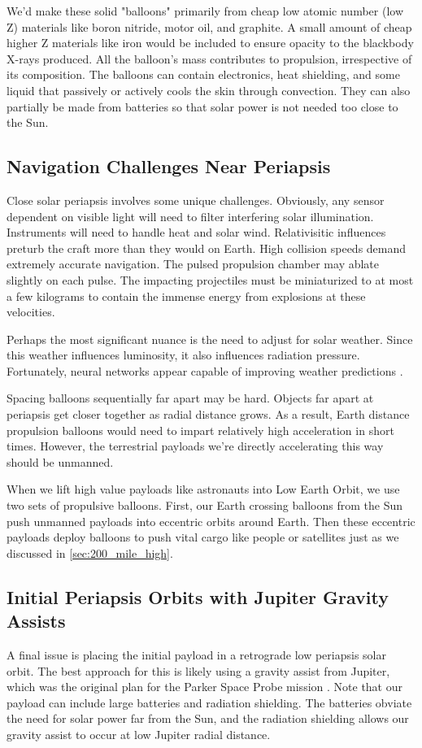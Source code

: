 \documentclass{article}
\begin{document}
{We'd make these solid "balloons" primarily from cheap low atomic number (low Z) materials like boron nitride, motor oil, and graphite.  A small amount of cheap higher Z materials like iron would be included to ensure opacity to the blackbody X-rays produced.  
All the balloon's mass contributes to propulsion, irrespective of its composition.  The balloons can contain electronics, heat shielding, and some liquid that passively or actively cools the skin through convection.     They can also partially be made from batteries so that solar power is not needed too close to the Sun.    

\subsection{Navigation Challenges Near Periapsis}
Close solar periapsis involves some unique challenges.   Obviously, any sensor dependent on visible light will need to filter interfering solar illumination.   Instruments will need to handle heat and solar wind.  Relativisitic influences preturb the craft more than they would on Earth.  High collision speeds demand extremely accurate navigation.   The pulsed propulsion chamber may ablate slightly on each pulse.  The impacting projectiles must be miniaturized to at most a few kilograms to contain the immense energy from explosions at these velocities. 

Perhaps the most significant nuance is the need to adjust for solar weather.  Since this weather influences luminosity, it also influences radiation pressure.   Fortunately, neural networks appear capable of improving weather predictions \cite{lam2023learning}.   

Spacing balloons sequentially far apart  may be hard.  Objects far apart at periapsis get closer together as radial distance grows.  As a result, Earth distance propulsion balloons would need to impart relatively high acceleration in short times.  However, the terrestrial payloads we're directly accelerating this way should be unmanned.   

When we lift high value payloads like astronauts into Low Earth Orbit, we use two sets of propulsive balloons. First, our Earth crossing balloons from the Sun push unmanned payloads into eccentric orbits around Earth. Then these eccentric payloads deploy balloons to push vital cargo like people or  satellites just as we discussed in \autoref{sec:200_mile_high}.

\subsection{Initial Periapsis Orbits with Jupiter Gravity Assists} \label{sec:jupiter_gravity_initial}
A final issue is placing the initial payload in a retrograde low periapsis solar orbit.  The best approach for this is likely using a gravity assist from Jupiter, which was the original plan for the Parker Space Probe mission \cite{mccomas2005solar}. Note that our payload can include large batteries and radiation shielding.  The batteries obviate the need for solar power far from the Sun, and the radiation shielding allows our gravity assist to occur at low Jupiter radial distance.   

}
\end{document}
